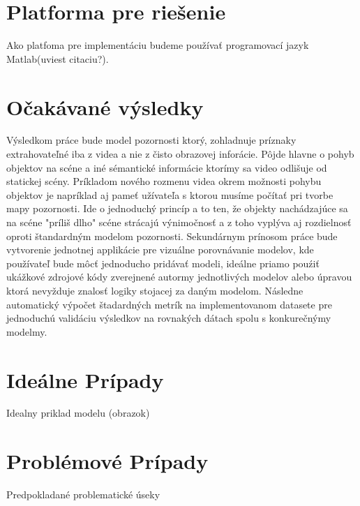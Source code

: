 \section{Platforma pre riešenie}
Ako platfoma pre implementáciu budeme používať programovací jazyk Matlab(uviest citaciu?).
\section{Očakávané výsledky}
Výsledkom práce bude model pozornosti ktorý, zohladnuje príznaky extrahovateľné iba z videa a nie z čisto obrazovej inforácie.
Pôjde hlavne o pohyb objektov na scéne a iné sémantické informácie ktorímy sa video odlišuje od statickej scény.
Príkladom nového rozmenu videa okrem možnosti pohybu objektov je napríklad aj pameť užívateľa s ktorou musíme počítať pri tvorbe mapy pozornosti.
Ide o jednoduchý princíp a to ten, že objekty nachádzajúce sa na scéne "príliš dlho" scéne strácajú výnimočnosť a z toho vyplýva aj rozdielnosť  oproti štandardným modelom pozornosti.
Sekundárnym prínosom práce bude vytvorenie jednotnej applikácie pre vizuálne porovnávanie modelov, kde používateľ bude môcť jednoducho pridávať modeli, ideálne priamo pouźiť ukážkové zdrojové kódy zverejnené autormy jednotlivých modelov alebo úpravou ktorá nevyžduje znalosť logiky stojacej za daným modelom.
Následne automatický výpočet štadardných metrík na implementovanom datasete pre jednoduchú validáciu výsledkov na rovnakých dátach spolu s konkurečnýmy modelmy.
\section{Ideálne Prípady}
Idealny priklad modelu (obrazok)
\section{Problémové Prípady}
Predpokladané problematické úseky
